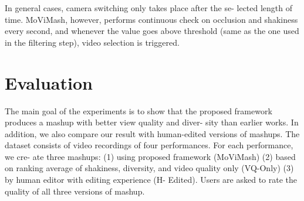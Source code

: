 \documentclass[conference]{IEEEtran}
\begin{document}
In general cases, camera switching only takes place after the se-
lected length of time. MoViMash, however, performs continuous
check on occlusion and shakiness every second, and whenever the
value goes above threshold (same as the one used in the filtering
step), video selection is triggered.

\section{Evaluation}
The main goal of the experiments is to show that the proposed
framework produces a mashup with better view quality and diver-
sity than earlier works. In addition, we also compare our result with
human-edited versions of mashups. The dataset consists of video
recordings of four performances. For each performance, we cre-
ate three mashups: (1) using proposed framework (MoViMash) (2)
based on ranking average of shakiness, diversity, and video quality
only (VQ-Only) (3) by human editor with editing experience (H-
Edited). Users are asked to rate the quality of all three versions of
mashup.








\end{document}
